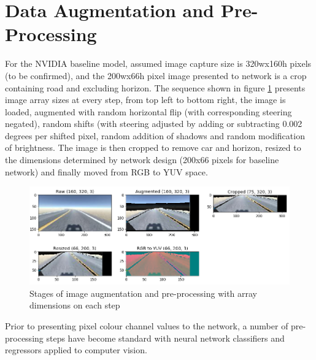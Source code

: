 \section{Data Augmentation and Pre-Processing}


For the NVIDIA baseline model, assumed image capture size is 320wx160h pixels (to be confirmed), and the 200wx66h pixel image presented to network is a crop containing road and excluding horizon. The sequence shown in figure \ref{fig:augpreproc} presents image array sizes at every step, from top left to bottom right, the image is loaded, augmented with random horizontal flip (with corresponding steering negated), random shifts (with steering adjusted by adding or subtracting 0.002 degrees per shifted pixel, random addition of shadows and random modification of brightness. The image is then cropped to remove car and horizon, resized to the dimensions determined by network design (200x66 pixels for baseline network) and finally moved from RGB to YUV space.

\begin{figure}[ht]
 \centering 
 \includegraphics[width=\textwidth]{Figures/AugmentationPreProcessing.png}
 \caption{Stages of image augmentation and pre-processing with array dimensions on each step}
 \label{fig:augpreproc}
\end{figure}

Prior to presenting pixel colour channel values to the network, a number of pre-processing steps have become standard with neural network classifiers and regressors applied to computer vision.

